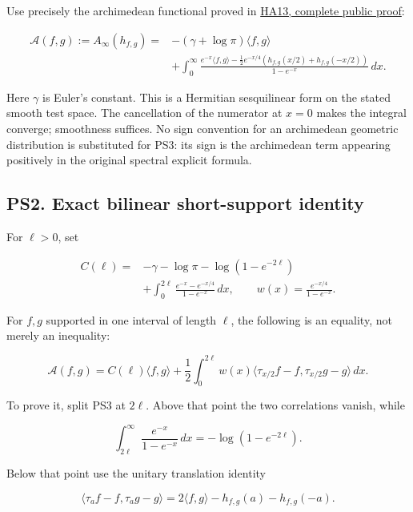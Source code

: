 \documentclass[
  10pt,
  a4paper,
]{article}
\begin{document}
Use precisely the archimedean functional proved in
\href{https://github.com/KokunoYumeto/zeta-function-research-reader/blob/76f421965914beb133df797835f940849844dc4f/workbenches/splitzero-tandem/branches/tau-zero-prime-positivity/HEAT_CAUCHY_ARITHMETIC_DERIVATION.md}{HA13,
complete public proof}:

\[
\begin{split}
\mathcal A(f,g):=A_\infty(h_{f,g})
={}&-(\gamma+\log\pi)\langle f,g\rangle\\
&+\int_0^\infty
\frac{e^{-x}\langle f,g\rangle
-\tfrac12e^{-x/4}(h_{f,g}(x/2)+h_{f,g}(-x/2))}
{1-e^{-x}}\,dx.
\end{split}
\tag{PS3}
\]

Here \(\gamma\) is Euler's constant. This is a Hermitian sesquilinear
form on the stated smooth test space. The cancellation of the numerator
at \(x=0\) makes the integral converge; smoothness suffices. No sign
convention for an archimedean geometric distribution is substituted for
PS3: its sign is the archimedean term appearing positively in the
original spectral explicit formula.

\subsection{PS2. Exact bilinear short-support
identity}\label{ps2.-exact-bilinear-short-support-identity}

For \(\ell>0\), set

\[
\begin{split}
C(\ell)={}&-\gamma-\log\pi
-\log(1-e^{-2\ell})\\
&+\int_0^{2\ell}\frac{e^{-x}-e^{-x/4}}{1-e^{-x}}\,dx,
\qquad
w(x)=\frac{e^{-x/4}}{1-e^{-x}}.
\end{split}
\tag{PS4}
\]

For \(f,g\) supported in one interval of length \(\ell\), the following
is an equality, not merely an inequality:

\[
\boxed{\mathcal A(f,g)=C(\ell)\langle f,g\rangle
+\frac12\int_0^{2\ell}w(x)
\langle\tau_{x/2}f-f,\tau_{x/2}g-g\rangle\,dx.}
\tag{PS5}
\]

To prove it, split PS3 at \(2\ell\). Above that point the two
correlations vanish, while

\[
\int_{2\ell}^\infty\frac{e^{-x}}{1-e^{-x}}\,dx
=-\log(1-e^{-2\ell}).
\]

Below that point use the unitary translation identity

\[
\langle\tau_a f-f,\tau_a g-g\rangle
=2\langle f,g\rangle-h_{f,g}(a)-h_{f,g}(-a).
\]
\end{document}
